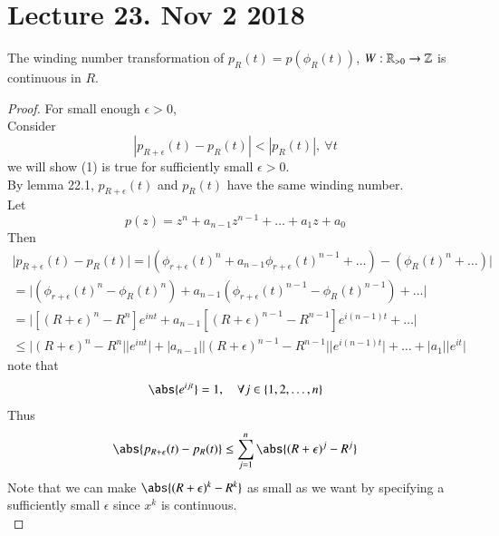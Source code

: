 \documentclass[11pt]{article}
\begin{document}
	\section{Lecture 23. Nov 2 2018}
		\begin{proposition}
			The winding number transformation of $p_R(t) = p(\phi_R(t))$, $W: \mathbb{R}_{> 0} \to \mathbb{Z}$ is continuous in $R$.
		\end{proposition}
		\begin{proof}
			For small enough $\epsilon > 0$, \\
			Consider 
			\begin{equation}
				|p_{R + \epsilon}(t) - p_R(t)| < |p_R(t)|,\ \forall t
			\end{equation}
			we will show (1) is true for sufficiently small $\epsilon > 0$. \\
			By lemma 22.1, $p_{R+\epsilon}(t)$ and $p_R(t)$ have the same winding number. \\
			Let 
			\begin{equation}
				p(z) = z^n + a_{n-1}z^{n-1} + \dots + a_1 z + a_0
			\end{equation}
			Then 
			\begin{gather}
				\big| p_{R+\epsilon}(t) - p_R(t) \big| = \big| (\phi_{r+\epsilon}(t)^n + a_{n-1}\phi_{r+\epsilon}(t)^{n-1} + \dots) - (\phi_{R}(t)^n + \dots) \big| \\
				= \big| (\phi_{r+\epsilon}(t)^n - \phi_R(t)^n) + a_{n-1}(\phi_{r+\epsilon}(t)^{n-1} - \phi_R(t)^{n-1}) + \dots \big| \\
				= \big| [(R+\epsilon)^n - R^n] e^{int} + a_{n-1} [(R+\epsilon)^{n-1} - R^{n-1}] e^{i(n-1)t} + \dots \big| \\
				\leq \big| (R+\epsilon)^n - R^n \big | \big |e^{int} \big| + \big| a_{n-1} \big| \big | (R+\epsilon)^{n-1} - R^{n-1} \big | \big | e^{i(n-1)t} \big | + \dots + \big |a_1 \big| \big |e^{it} \big |
			\end{gather}
			note that
			\begin{equation}
				\abs{e^{ijt}} = 1,\quad \forall j \in \{1, 2, \dots, n\}
			\end{equation}
			Thus
			\begin{gather}
				\abs{p_{R+\epsilon}(t) - p_R(t)} \leq \sum_{j=1}^n \abs{(R + \epsilon)^j - R^j}
			\end{gather}
			Note that we can make $\abs{(R+\epsilon)^k - R^k}$ as small as we want by specifying a sufficiently small $\epsilon$ since $x^k$ is continuous. \\
		\end{proof}
		
\end{document}
